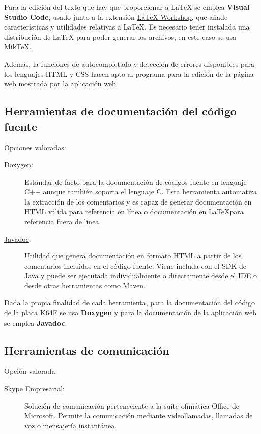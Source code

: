 Para la edición del texto que hay que proporcionar a \LaTeX{} se emplea
\textbf{Visual Studio Code}, usado junto a la extensión \href{https://marketplace.visualstudio.com/items?itemName=James-Yu.latex-workshop}
{LaTeX Workshop}, que añade características y utilidades relativas a \LaTeX.
Es necesario tener instalada una distribución de \LaTeX{} para poder generar los
archivos, en este caso se usa \href{https://miktex.org/}{MikTeX}.

Además, la funciones de autocompletado y detección de errores disponibles para
los lenguajes HTML y CSS hacen apto al programa para la edición de la página
web mostrada por la aplicación web.

\subsection{Herramientas de documentación del código fuente}
{\label{sec:source-docs}}
Opciones valoradas:
\begin{description}
  \item[\href{http://www.doxygen.nl/}{Doxygen}:] Estándar de facto para la
  documentación de códigos fuente en lenguaje C++ aunque también soporta el
  lenguaje C. Esta herramienta automatiza la extracción de los comentarios y
  es capaz de generar documentación en HTML válida para referencia en línea o
  documentación en \LaTeX para referencia fuera de línea.
  \item[\href{https://www.oracle.com/technetwork/java/javase/documentation/javadoc-137458.html}
  {Javadoc}:] Utilidad que genera documentación en formato HTML a partir de los
  comentarios incluidos en el código fuente. Viene includa con el SDK de Java 
  y puede ser ejecutada individualmente o directamente desde el IDE o desde
  otras herramientas como Maven.
\end{description}

Dada la propia finalidad de cada herramienta, para la documentación del código
de la placa K64F se usa \textbf{Doxygen} y para la documentación de la
aplicación web se emplea \textbf{Javadoc}.

\subsection{Herramientas de comunicación}
Opción valorada:
\begin{description}
  \item[\href{https://www.skype.com/es/business/}{Skype Empresarial}:] Solución
  de comunicación perteneciente a la suite ofimática Office de Microsoft.
  Permite la comunicación mediante videollamadas, llamadas de voz o mensajería
  instantánea.
\end{description}

